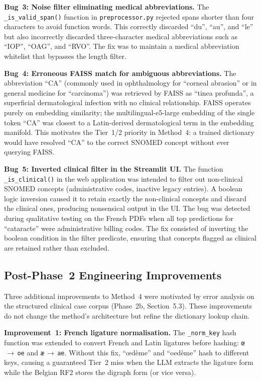 \textbf{Bug~3: Noise filter eliminating medical abbreviations.} The \texttt{\_is\_valid\_span()} function in \texttt{preprocessor.py} rejected spans shorter than four characters to avoid function words. This correctly discarded ``du'', ``au'', and ``le'' but also incorrectly discarded three-character medical abbreviations such as ``IOP'', ``OAG'', and ``RVO''. The fix was to maintain a medical abbreviation whitelist that bypasses the length filter.

\textbf{Bug~4: Erroneous FAISS match for ambiguous abbreviations.} The abbreviation ``CA'' (commonly used in ophthalmology for ``corneal abrasion'' or in general medicine for ``carcinoma'') was retrieved by FAISS as ``tinea profunda'', a superficial dermatological infection with no clinical relationship. FAISS operates purely on embedding similarity; the multilingual-e5-large embedding of the single token ``CA'' was closest to a Latin-derived dermatological term in the embedding manifold. This motivates the Tier~1/2 priority in Method~4: a trained dictionary would have resolved ``CA'' to the correct SNOMED concept without ever querying FAISS.

\textbf{Bug~5: Inverted clinical filter in the Streamlit UI.} The function \texttt{\_is\_clinical()} in the web application was intended to filter out non-clinical SNOMED concepts (administrative codes, inactive legacy entries). A boolean logic inversion caused it to retain exactly the non-clinical concepts and discard the clinical ones, producing nonsensical output in the UI. The bug was detected during qualitative testing on the French PDFs when all top predictions for ``cataracte'' were administrative billing codes. The fix consisted of inverting the boolean condition in the filter predicate, ensuring that concepts flagged as clinical are retained rather than excluded.

\subsection{Post-Phase~2 Engineering Improvements}
\label{sec:m4-improvements}

Three additional improvements to Method~4 were motivated by error analysis on the structured clinical case corpus (Phase~2b, Section~5.3). These improvements do not change the method's architecture but refine the dictionary lookup chain.

\textbf{Improvement~1: French ligature normalisation.} The \texttt{\_norm\_key} hash function was extended to convert French and Latin ligatures before hashing: \texttt{œ}$\,\rightarrow\,$\texttt{oe} and \texttt{æ}$\,\rightarrow\,$\texttt{ae}. Without this fix, ``œdème'' and ``oedème'' hash to different keys, causing a guaranteed Tier~2 miss when the LLM extracts the ligature form while the Belgian RF2 stores the digraph form (or vice versa).

